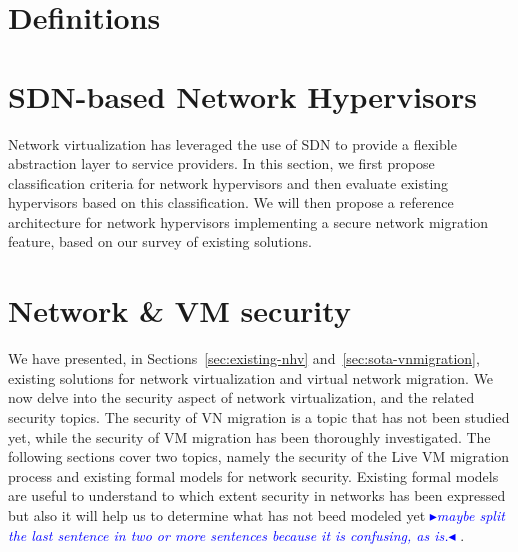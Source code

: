 \documentclass[a4paper, 11pt]{report}
\newcommand{\boxedtext}[1]{\fbox{\scriptsize\bfseries\textsf{#1}}}
\newcommand{\myremark}[2]{
   \textcolor{blue}{\boxedtext{#1}
      {\small$\blacktriangleright$\emph{\textsl{#2}}$\blacktriangleleft$}
}}
\newcommand\GB[1]{\myremark{GB}{#1}}
\theoremstyle{definition}
\begin{document}
\section{Definitions}
\label{sec:basic_def}


\section{SDN-based Network Hypervisors}

Network virtualization has leveraged the use of SDN to provide a flexible abstraction layer to service providers. In this section, we first propose classification criteria for network hypervisors and then evaluate existing hypervisors based on this classification. We will then propose a reference architecture for network hypervisors implementing a secure network migration feature, based on our survey of existing solutions.















\section{Network \& VM security}

We have presented, in Sections~\ref{sec:existing-nhv} and~\ref{sec:sota-vnmigration}, existing solutions for network virtualization and virtual network migration. We now delve into the security aspect of network virtualization, and the related security topics. The security of VN migration is a topic that has not been studied yet, while the security of VM migration has been thoroughly investigated. The following sections cover two topics, namely the security of the Live VM migration process and existing formal models for network security.
Existing formal models are useful to understand to which extent security in networks has been expressed but also it will help us to determine what has not beed modeled yet\GB{maybe split the last sentence in two or more sentences because it is confusing, as is.}.
\end{document}
